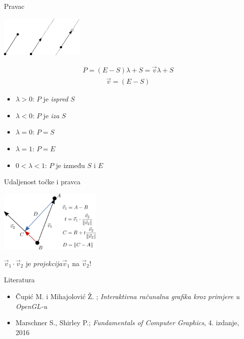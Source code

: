 \documentclass[9pt]{beamer}
\begin{document}
\begin{frame}{Pravac}
	\begin{center}
		\includegraphics[height=2cm]{./slike/linear_algebra_pravci.png}
	\end{center}
	\begin{align*}
		P = (E-S)\lambda + S = \vec{v}\lambda + S
	\end{align*}
	\begin{align*}
	\vec{v} = (E-S)
	\end{align*}
	
	\begin{itemize}
		\item $\lambda > 0$: $P$ je \textit{ispred} $S$
		\item $\lambda < 0$: $P$ je \textit{iza} $S$
		\item $\lambda = 0$: $P = S$
		\item $\lambda = 1$: $P = E$
		\item $0 < \lambda < 1$: $P$ je između $S$ i $E$
	\end{itemize}
\end{frame}

\begin{frame}{Udaljenost točke i pravca}
	\begin{center}
		\includegraphics[height=3cm]{./slike/linear_algebra_line_point_distance.png}
	\end{center}
	$\vec{v}_1\cdot \vec{v}_2$ je \textit{projekcija}$\vec{v}_1$ na $\vec{v}_2$!
\end{frame}
\begin{frame}{Literatura}
	\begin{itemize}
		\item Čupić M. i Mihajolović Ž. ; \textit{Interaktivna računalna grafika kroz primjere u OpenGL-u}
		\item Marschner S., Shirley P.; \textit{Fundamentals of Computer Graphics}, 4. izdanje, 2016
	\end{itemize}
\end{frame}
\end{document}
